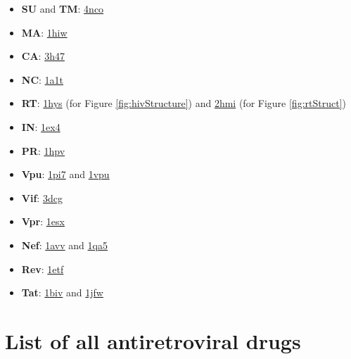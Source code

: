 \documentclass[
  11pt,
  twoside]{scrbook}
\begin{document}
\begin{itemize}
\item
  \textbf{SU} and \textbf{TM}: \href{http://www.rcsb.org/pdb/explore.do?structureId=4nco}{4nco}
\item
  \textbf{MA}: \href{http://rcsb.org/pdb/explore/explore.do?structureId=1hiw}{1hiw}
\item
  \textbf{CA}: \href{http://rcsb.org/pdb/explore/explore.do?structureId=3h47}{3h47}
\item
  \textbf{NC}: \href{http://rcsb.org/pdb/explore/explore.do?structureId=1a1t}{1a1t}
\item
  \textbf{RT}: \href{http://www.rcsb.org/pdb/explore.do?structureId=1hys}{1hys} (for Figure \ref{fig:hivStructure}) and \href{http://www.rcsb.org/pdb/explore.do?structureId=2hmi}{2hmi} (for Figure \ref{fig:rtStruct})
\item
  \textbf{IN}: \href{http://www.rcsb.org/pdb/explore.do?structureId=1ex4}{1ex4}
\item
  \textbf{PR}: \href{http://www.rcsb.org/pdb/explore.do?structureId=1hpv}{1hpv}
\item
  \textbf{Vpu}: \href{http://www.rcsb.org/pdb/explore.do?structureId=1pi7}{1pi7} and \href{http://www.rcsb.org/pdb/explore.do?structureId=1vpu}{1vpu}
\item
  \textbf{Vif}: \href{http://www.rcsb.org/pdb/explore.do?structureId=3dcg}{3dcg}
\item
  \textbf{Vpr}: \href{http://www.rcsb.org/pdb/explore.do?structureId=1esx}{1esx}
\item
  \textbf{Nef}: \href{http://www.rcsb.org/pdb/explore.do?structureId=1avv}{1avv} and \href{http://www.rcsb.org/pdb/explore.do?structureId=1qa5}{1qa5}
\item
  \textbf{Rev}: \href{http://www.rcsb.org/pdb/explore.do?structureId=1etf}{1etf}
\item
  \textbf{Tat}: \href{http://www.rcsb.org/pdb/explore.do?structureId=1biv}{1biv} and \href{http://www.rcsb.org/pdb/explore.do?structureId=1jfw}{1jfw}
\end{itemize}

\hypertarget{list-of-all-antiretroviral-drugs}{%
\section{List of all antiretroviral drugs}\label{list-of-all-antiretroviral-drugs}}
\end{document}
